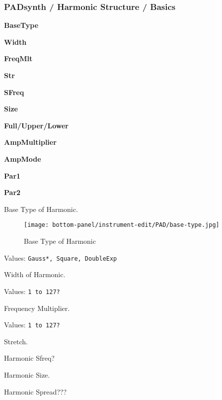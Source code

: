 \subsubsection{PADsynth / Harmonic Structure / Basics}
\label{subsubsec:padsynth_harmonic_structure_basics}

   \begin{enumber}
      \item \textbf{BaseType}
      \item \textbf{Width}
      \item \textbf{FreqMlt}
      \item \textbf{Str}
      \item \textbf{SFreq}
      \item \textbf{Size}
      \item \textbf{Full/Upper/Lower}
      \item \textbf{AmpMultiplier}
      \item \textbf{AmpMode}
      \item \textbf{Par1}
      \item \textbf{Par2}
   \end{enumber}

   \setcounter{ItemCounter}{0}      %

   Base Type of Harmonic.

\begin{figure}[H]
   \centering 
   \texttt{[image: bottom-panel/instrument-edit/PAD/base-type.jpg]}
   \caption{Base Type of Harmonic}
   \label{fig:padsynth_base_type_of_harmonic}
\end{figure}

   Values: \texttt{Gauss*, Square, DoubleExp}

   Width of Harmonic.

   Values: \texttt{1 to 127?}

   Frequency Multiplier.

   Values: \texttt{1 to 127?}

   Stretch.

   Harmonic Sfreq?

   Harmonic Size.

   Harmonic Spread???

